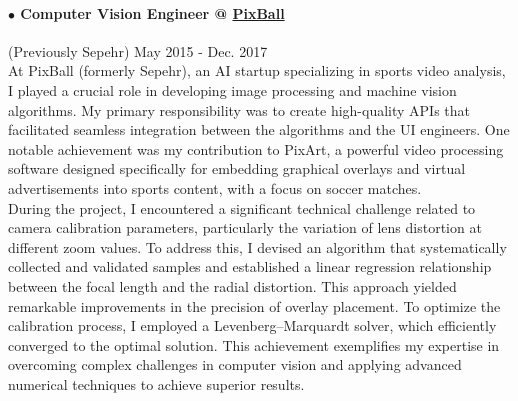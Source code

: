 \documentclass[10pt]{res}
\begin{document}
\begin{resume}
\paragraph{$\bullet$ Computer Vision Engineer @ \href{http://pixballsports.com}{PixBall}} (Previously Sepehr) \hfill May 2015 - Dec. 2017\\
At PixBall (formerly Sepehr), an AI startup specializing in sports video analysis, I played a crucial role in developing image processing and machine vision algorithms. My primary responsibility was to create high-quality APIs that facilitated seamless integration between the algorithms and the UI engineers. One notable achievement was my contribution to PixArt, a powerful video processing software designed specifically for embedding graphical overlays and virtual advertisements into sports content, with a focus on soccer matches.\\
During the project, I encountered a significant technical challenge related to camera calibration parameters, particularly the variation of lens distortion at different zoom values. To address this, I devised an algorithm that systematically collected and validated samples and established a linear regression relationship between the focal length and the radial distortion. This approach yielded remarkable improvements in the precision of overlay placement. To optimize the calibration process, I employed a Levenberg–Marquardt solver, which efficiently converged to the optimal solution. This achievement exemplifies my expertise in overcoming complex challenges in computer vision and applying advanced numerical techniques to achieve superior results.

\vspace{-12pt}





\end{resume}
\end{document}

